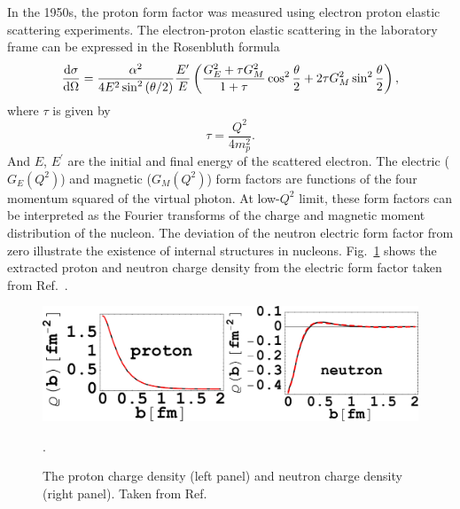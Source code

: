 In the 1950s, the proton form factor was measured using electron proton elastic
scattering experiments\cite{hofstadter1956}. The electron-proton elastic 
scattering in the laboratory frame can be expressed in the Rosenbluth formula
\begin{equation}
\dv{\sigma}{\Omega} = \frac{\alpha^2}{4E^2 \sin^2\left(\theta/2\right)} 
	\frac{E^\prime}{E} \left( \frac{G_E^2+\tau G_M^2}{1+\tau} \cos^2 
	\frac{\theta}{2} + 2\tau G_M^2 \sin^2 \frac{\theta}{2}\right)
	\label{eq:ep_cs},
\end{equation}
where $\tau$ is given by
\begin{equation}
\tau = \frac{Q^2}{4m_p^2}.
\end{equation}
And $E$, $E^\prime$ are the initial and final energy of the scattered electron.
The electric ($G_E\left(Q^2\right)$) and magnetic ($G_M\left(Q^2\right)$) form
factors are functions of the four momentum squared of the virtual photon. At 
low-$Q^2$ limit, these form factors can be interpreted as the Fourier transforms
of the charge and magnetic moment distribution of the nucleon. The deviation of
the neutron electric form factor from zero illustrate the existence of internal
structures in nucleons. Fig.\ \ref{fig:charge} shows the extracted proton and 
neutron charge density from the electric form factor taken from Ref.\ 
\cite{miller2007}.
\begin{figure}[htbp!]
    \centering
    \includegraphics[width=0.9\linewidth]{./images/charge_distribution_rotated}
    \caption{The proton charge density (left panel) and neutron charge density
	(right panel). Taken from Ref.\ \cite{miller2007}}.
    \label{fig:charge}
\end{figure}


